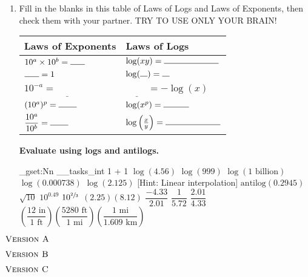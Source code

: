 \documentclass[12pt,letterpaper]{article}
\newcommand{\SetProbNumber}[1]{
  \int_gset:Nn \g__tasks_int {#1 + 1}
}
\begin{document}
\begin{enumerate}

\item Fill in the blanks in this table of Laws of Logs and Laws of Exponents, then check them with your partner. TRY TO USE ONLY YOUR BRAIN!

\begin{center}
\def\arraystretch{1.5}
\begin{tabular}{ll}
Laws of Exponents & Laws of Logs \\
\hline
$10^a \times 10^b = \rule{4ex}{0.15mm}$ & $\log(xy) = \rule{15ex}{0.15mm}$ \\
$\rule{4ex}{0.15mm}=1$ & $\log(\rule{2ex}{0.15mm})=\rule{2ex}{0.15mm}$ \\
$10^{-a}=\underline{\phantom{\frac{1}{10^a}\frac{1}{10^a}}}$ 
& $\underline{\phantom{\frac{1}{10^a}\frac{1}{10^a}}}=-\log(x)$ \\
$(10^a)^p=\rule{5ex}{0.15mm}$ & $\log(x^p) = \rule{7ex}{0.15mm}$ \\
$\dfrac{10^a}{10^b} = \rule{5ex}{0.15mm}$ & $\log\left (\frac{x}{y}\right ) = \rule{15ex}{0.15mm}$
\end{tabular}
\end{center}

\hspace*{-1.25em}\textbf{Evaluate using logs and antilogs.}
\begin{problems}
\problem\SetProbNumber{1} $\log(4.56)$
\problem $\log(999)$
\problem $\log(\text{1 billion})$
\problem $\log(0.000738)$ 
\problem $\log(2.125)$ [Hint: Linear interpolation]
\problem $\text{antilog}(0.2945)$
\problem $\sqrt{10}$
\problem $10^{0.49}$
\problem $10^{\sfrac{2}{3}}$
\problem $(2.25)(8.12)$
\problem $\dfrac{-4.33}{2.01}$
\problem $\dfrac{1}{5.72}$
\problem $\dfrac{2.01}{4.33}$
\problem $\left (\dfrac{12 \text{ in}}{1 \text{ ft}} \right )\left (\dfrac{5280 \text{ ft}}{1 \text{ mi}}\right ) \left (\dfrac{1 \text{ mi}}{1.609 \text{ km}}\right )$
\end{problems}

\end{enumerate}

\pagebreak 
\mbox{}
\vfill
\begin{center}
\Huge $\textsc{Version A}$
\end{center}
\vfill
\vfill

\pagebreak 
\mbox{}
\vfill
\begin{center}
\Huge $\textsc{Version B}$
\end{center}
\vfill
\vfill

\pagebreak 
\mbox{}
\vfill
\begin{center}
\Huge $\textsc{Version C}$
\end{center}
\vfill
\vfill
\end{document}
